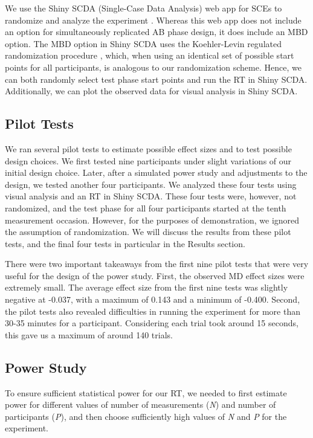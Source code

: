 \documentclass{article}
\begin{document}
We use the Shiny SCDA (Single-Case Data Analysis) web app for SCEs to randomize and analyze the experiment \autocite{bib47}. Whereas this web app does not include an option for simultaneously replicated AB phase design, it does include an MBD option. The MBD option in Shiny SCDA uses the Koehler-Levin regulated randomization procedure \autocite{bib48}, which, when using an identical set of possible start points for all participants, is analogous to our randomization scheme. Hence, we can both randomly select test phase start points and run the RT in Shiny SCDA. Additionally, we can plot the observed data for visual analysis in Shiny SCDA. 

\subsection{Pilot Tests} 

We ran several pilot tests to estimate possible effect sizes and to test possible design choices. We first tested nine participants under slight variations of our initial design choice. Later, after a simulated power study and adjustments to the design, we tested another four participants. We analyzed these four tests using visual analysis and an RT in Shiny SCDA. These four tests were, however, not randomized, and the test phase for all four participants started at the tenth measurement occasion. However, for the purposes of demonstration, we ignored the assumption of randomization. We will discuss the results from these pilot tests, and the final four tests in particular in the Results section. 

There were two important takeaways from the first nine pilot tests that were very useful for the design of the power study. First, the observed MD effect sizes were extremely small. The average effect size from the first nine tests was slightly negative at -0.037, with a maximum of 0.143 and a minimum of -0.400. Second, the pilot tests also revealed difficulties in running the experiment for more than 30-35 minutes for a participant. Considering each trial took around 15 seconds, this gave us a maximum of around 140 trials.

\subsection{Power Study} 

To ensure sufficient statistical power for our RT, we needed to first estimate power for different values of number of measurements (\emph{N}) and number of participants (\emph{P}), and then choose sufficiently high values of \emph{N} and \emph{P} for the experiment. 
\end{document}
